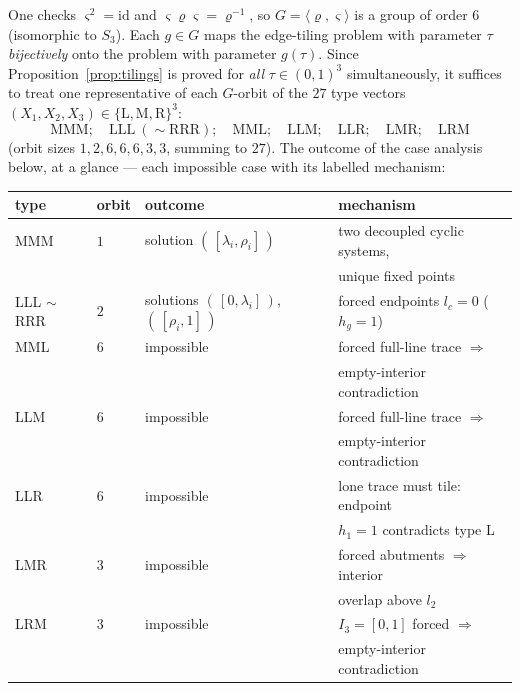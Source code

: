 \documentclass{aims}
\numberwithin{equation}{section}
\theoremstyle{plain}
\theoremstyle{definition}
\theoremstyle{remark}
\begin{document}
One checks $\varsigma^2=\mathrm{id}$ and
$\varsigma\varrho\varsigma=\varrho^{-1}$, so
$G=\langle\varrho,\varsigma\rangle$ is a group of order $6$ (isomorphic to
$S_3$). Each $g\in G$ maps the edge-tiling problem with parameter $\tau$
\emph{bijectively} onto the problem with parameter $g(\tau)$. Since
Proposition~\ref{prop:tilings} is proved for \emph{all} $\tau\in(0,1)^3$
simultaneously, it suffices to treat one representative of each $G$-orbit of
the $27$ type vectors $(X_1,X_2,X_3)\in\{\mathrm L,\mathrm M,\mathrm R\}^3$:
\[
\mathrm{MMM};\quad \mathrm{LLL}\ (\sim\mathrm{RRR});\quad \mathrm{MML};\quad
\mathrm{LLM};\quad \mathrm{LLR};\quad \mathrm{LMR};\quad \mathrm{LRM}
\]
(orbit sizes $1,2,6,6,6,3,3$, summing to $27$). The outcome of the case
analysis below, at a glance --- each impossible case with its labelled
mechanism:

\begin{center}
\begin{tabular}{@{}llll@{}}
\hline
type & orbit & outcome & mechanism\\
\hline
MMM & $1$ & solution $(\,[\lambda_i,\rho_i]\,)$ & two decoupled cyclic
systems,\\
 & & & unique fixed points\\
LLL $\sim$ RRR & $2$ & solutions $(\,[0,\lambda_i]\,)$, $(\,[\rho_i,1]\,)$
 & forced endpoints $l_c=0$ ($h_g=1$)\\
MML & $6$ & impossible & forced full-line trace $\Rightarrow$\\
 & & & empty-interior contradiction\\
LLM & $6$ & impossible & forced full-line trace $\Rightarrow$\\
 & & & empty-interior contradiction\\
LLR & $6$ & impossible & lone trace must tile: endpoint\\
 & & & $h_1=1$ contradicts type L\\
LMR & $3$ & impossible & forced abutments $\Rightarrow$ interior\\
 & & & overlap above $l_2$\\
LRM & $3$ & impossible & $I_3=[0,1]$ forced $\Rightarrow$\\
 & & & empty-interior contradiction\\
\hline
\end{tabular}
\end{center}
\end{document}
